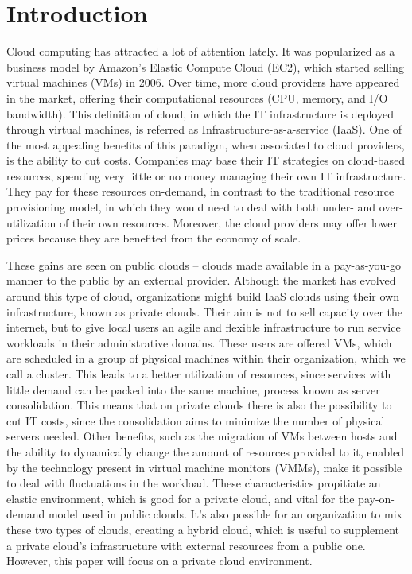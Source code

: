 \chapter{\textbf{Introduction}}

\label{Introduction}

Cloud computing has attracted a lot of attention lately. It was popularized as a business model by Amazon's Elastic Compute Cloud (EC2), which started selling virtual machines (VMs) in 2006. Over time, more cloud providers have appeared in the market, offering their computational resources (CPU, memory, and I/O bandwidth). This definition of cloud, in which the IT infrastructure is deployed through virtual machines, is referred as Infrastructure-as-a-service (IaaS). One of the most appealing benefits of this paradigm, when associated to cloud providers, is the ability to cut costs. Companies may base their IT strategies on cloud-based resources, spending very little or no money managing their own IT infrastructure. They pay for these resources on-demand, in contrast to the traditional resource provisioning model, in which they would need to deal with both under- and over- utilization of their own resources. Moreover, the cloud providers may offer lower prices because they are benefited from the economy of 
scale.


These gains are seen on public clouds -- clouds made available in a pay-as-you-go manner to the public by an external provider. Although the market has evolved around this type of cloud, organizations might build IaaS clouds using their own infrastructure, known as private clouds. Their aim is not to sell capacity  over the internet,  but to give local users an agile and flexible infrastructure to run service workloads in their administrative domains. These users are offered VMs, which are scheduled in a group of physical machines within their organization, which we call a cluster. This leads to a better utilization of resources, since services with little demand can be packed into the same machine, process known as server consolidation. This means that on private clouds there is also the possibility to cut IT costs, since the consolidation aims to minimize the number of physical servers needed. Other benefits, such as the migration of VMs between hosts and the ability to dynamically change the 
amount of resources provided to it, enabled by the  technology present in virtual machine monitors (VMMs), make it 
possible to deal with fluctuations in the workload. These characteristics propitiate an elastic environment, which is good for a private cloud, and vital for the pay-on-demand model used in public clouds.  It's also possible for an organization to mix these two types of clouds, creating a hybrid cloud,  which is useful to supplement a private cloud's infrastructure with external resources from a public one. However, this paper will focus on a private cloud environment. 

